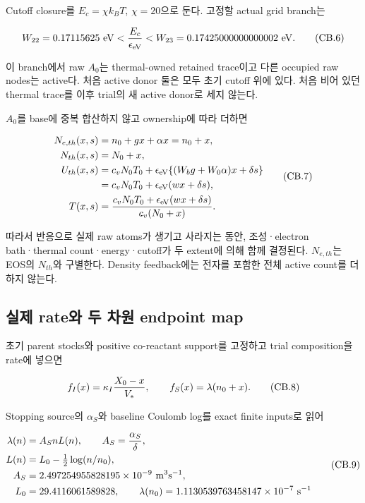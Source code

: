 Cutoff closure를 \(E_c=\chi k_BT\), \(\chi=20\)으로 둔다. 고정할 actual grid branch는

\[
 W_{22}=0.17115625\ {\rm eV}
 <{E_c\over\epsilon_{\rm eV}}
 <W_{23}=0.17425000000000002\ {\rm eV}.
 \tag{CB.6}
\]

이 branch에서 raw \(A_0\)는 thermal-owned retained trace이고 다른 occupied raw nodes는 active다. 처음 active donor 둘은 모두 초기 cutoff 위에 있다. 처음 비어 있던 thermal trace를 이후 trial의 새 active donor로 세지 않는다.

\(A_0\)를 base에 중복 합산하지 않고 ownership에 따라 더하면

\[
 \begin{aligned}
 N_{e,th}(x,s)&=n_0+gx+\alpha x=n_0+x,\\
 N_{th}(x,s)&=N_0+x,\\
 U_{th}(x,s)&=c_vN_0T_0+
             \epsilon_{\rm eV}\{(W_bg+W_0\alpha)x+\delta s\}\\
 &=c_vN_0T_0+\epsilon_{\rm eV}(wx+\delta s),\\
 T(x,s)&={c_vN_0T_0+\epsilon_{\rm eV}(wx+\delta s)
                    \over c_v(N_0+x)}.
 \end{aligned}\tag{CB.7}
\]

따라서 반응으로 실제 raw atoms가 생기고 사라지는 동안, 조성·electron bath·thermal count·energy·cutoff가 두 extent에 의해 함께 결정된다. \(N_{e,th}\)는 EOS의 \(N_{th}\)와 구별한다. Density feedback에는 전자를 포함한 전체 active count를 더하지 않는다.

\hypertarget{uxc2e4uxc81c-rateuxc640-uxb450-uxcc28uxc6d0-endpoint-map}{%
\subsection{실제 rate와 두 차원 endpoint map}\label{uxc2e4uxc81c-rateuxc640-uxb450-uxcc28uxc6d0-endpoint-map}}

초기 parent stocks와 positive co-reactant support를 고정하고 trial composition을 rate에 넣으면

\[
 f_I(x)=\kappa_I{X_0-x\over V_*},\qquad
 f_S(x)=\lambda(n_0+x).
 \tag{CB.8}
\]

Stopping source의 \(\alpha_S\)와 baseline Coulomb log를 exact finite inputs로 읽어

\[
 \begin{aligned}
 \lambda(n)&=A_S n L(n),\qquad A_S={\alpha_S\over\delta},\\
 L(n)&=L_0-\tfrac12\log(n/n_0),\\
 A_S&=2.497254955828195\times10^{-9}\ {\rm m^3s^{-1}},\\
 L_0&=29.4116061589828,\qquad
 \lambda(n_0)=1.1130539763458147\times10^{-7}\ {\rm s^{-1}}
 \end{aligned}\tag{CB.9}
\]

